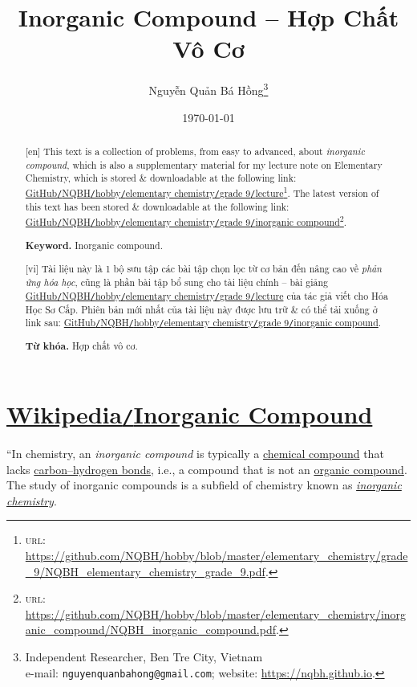 \documentclass{article}
\title{Inorganic Compound -- Hợp Chất Vô Cơ}
\author{Nguyễn Quản Bá Hồng\footnote{Independent Researcher, Ben Tre City, Vietnam\\e-mail: \texttt{nguyenquanbahong@gmail.com}; website: \url{https://nqbh.github.io}.}}
\date{\today}
\begin{document}
\maketitle
\begin{abstract}
	\textsf{[en]} This text is a collection of problems, from easy to advanced, about \textit{inorganic compound}, which is also a supplementary material for my lecture note on Elementary Chemistry, which is stored \& downloadable at the following link: \href{https://github.com/NQBH/hobby/blob/master/elementary_chemistry/grade_9/NQBH_elementary_chemistry_grade_9.pdf}{GitHub\texttt{/}NQBH\texttt{/}hobby\texttt{/}elementary chemistry\texttt{/}grade 9\texttt{/}lecture}\footnote{\textsc{url}: \url{https://github.com/NQBH/hobby/blob/master/elementary_chemistry/grade_9/NQBH_elementary_chemistry_grade_9.pdf}.}. The latest version of this text has been stored \& downloadable at the following link: \href{https://github.com/NQBH/hobby/blob/master/elementary_chemistry/inorganic_compound/NQBH_inorganic_compound.pdf}{GitHub\texttt{/}NQBH\texttt{/}hobby\texttt{/}elementary chemistry\texttt{/}grade 9\texttt{/}inorganic compound}\footnote{\textsc{url}: \url{https://github.com/NQBH/hobby/blob/master/elementary_chemistry/inorganic_compound/NQBH_inorganic_compound.pdf}.}.
	
	\textsf{\textbf{Keyword.} Inorganic compound.}
	\vspace{2mm}
	
	\textsf{[vi]} Tài liệu này là 1 bộ sưu tập các bài tập chọn lọc từ cơ bản đến nâng cao về \textit{phản ứng hóa học}, cũng là phần bài tập bổ sung cho tài liệu chính -- bài giảng \href{https://github.com/NQBH/hobby/blob/master/elementary_chemistry/grade_9/NQBH_elementary_chemistry_grade_9.pdf}{GitHub\texttt{/}NQBH\texttt{/}hobby\texttt{/}elementary chemistry\texttt{/}grade 9\texttt{/}lecture} của tác giả viết cho Hóa Học Sơ Cấp. Phiên bản mới nhất của tài liệu này được lưu trữ \& có thể tải xuống ở link sau: \href{https://github.com/NQBH/hobby/blob/master/elementary_chemistry/grade_9/real/NQBH_real.pdf}{GitHub\texttt{/}NQBH\texttt{/}hobby\texttt{/}elementary chemistry\texttt{/}grade 9\texttt{/}inorganic compound}.
	
	\textsf{\textbf{Từ khóa.} Hợp chất vô cơ.}
\end{abstract}
\setcounter{secnumdepth}{4}
\setcounter{tocdepth}{3}
\tableofcontents
\newpage


\section{\href{https://en.wikipedia.org/wiki/Inorganic_compound}{Wikipedia\texttt{/}Inorganic Compound}}
``In chemistry, an \textit{inorganic compound} is typically a \href{https://en.wikipedia.org/wiki/Chemical_compound}{chemical compound} that lacks \href{https://en.wikipedia.org/wiki/Carbon%E2%90%93hydrogen_bond}{carbon--hydrogen bonds}, i.e., a compound that is not an \href{https://en.wikipedia.org/wiki/Organic_compound}{organic compound}. The study of inorganic compounds is a subfield of chemistry known as \href{https://en.wikipedia.org/wiki/Inorganic_chemistry}{\textit{inorganic chemistry}}.
\end{document}
